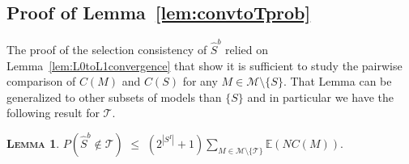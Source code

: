 \documentclass[aos]{imsart}
\theoremstyle{plain}
\newtheorem{lem}{\textsc{Lemma}}[section]
\newcommand{\E}{\mathbb{E}}
\begin{document}
\begin{supplement}
\subsection{Proof of Lemma~\ref{lem:convtoTprob}}

The proof of the selection consistency of $\hat{S}^b$ relied on Lemma~\ref{lem:L0toL1convergence} that show it is sufficient to study the pairwise comparison of $C(M)$ and $C(S)$ for any $M\in\mathcal{M}\setminus\{S\}$. That Lemma can be generalized to other subsets of models than $\{S\}$ and in particular we have the following result for $\mathcal{T}$.
\begin{lem}\label{lem:L0toL1convergence2}
$P(\hat{S}^{b} \not\in \mathcal{T} ) \,\,\leq \,\, (2^{|S^I|}+1) \sum_{M \in \mathcal{M}\setminus \{\mathcal{T}\}} \E\left(NC(M)\right).$
\end{lem}


\end{supplement}
\end{document}
